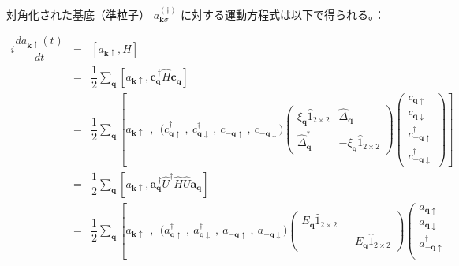 \documentclass[uplatex,a4j,12pt,dvipdfmx]{jsarticle}
\begin{document}
対角化された基底（準粒子） $a_{\bm{k} \sigma}^{(\dagger)}$
に対する運動方程式は以下で得られる。：

\begin{eqnarray}
	i \dfrac{d a_{\bm{k}\uparrow}(t)}{dt}
	&=&
	\left[ a_{\bm{k}\uparrow} , H \right]
	\nonumber \\[2mm] &=&
	\dfrac{1}{2}
	\sum_{\bm{q}}
	\left[ a_{\bm{k}\uparrow} , \bm{c}_{\bm{q}}^{\ \dagger} \hat{H} \bm{c}_{\bm{q}} \right]
	\nonumber \\[2mm] &=&
	\dfrac{1}{2}
	\sum_{\bm{q}}
	\left[ a_{\bm{k}\uparrow}
		\ \ , \ \
		\big( c^{\dagger}_{\bm{q} \uparrow} \ , \ c^{\dagger}_{\bm{q} \downarrow} \ , \ c_{-\bm{q} \uparrow} \ , \ c_{-\bm{q} \downarrow}  \big)
		\!\!\!
		\left(
		\begin{array}{cc}
				\xi_{\bm{q}} \hat{1}_{2 \times 2} & \hat{\Delta}_{\bm{q}}               \\[3mm]
				\hat{\Delta}^{*}_{\bm{q}}         & - \xi_{\bm{q}} \hat{1}_{2 \times 2}
			\end{array}
		\right)
		\!\!\!
		\left(
		\begin{array}{c}
				c_{\bm{q} \uparrow}            \\[2mm]
				c_{\bm{q} \downarrow}          \\[2mm]
				c^{\dagger}_{-\bm{q} \uparrow} \\[2mm]
				c^{\dagger}_{-\bm{q} \downarrow}
			\end{array}
		\right)
		\right]
	\nonumber \\[2mm] &=&
	\dfrac{1}{2}
	\sum_{\bm{q}}
	\left[ a_{\bm{k}\uparrow} , \bm{a}_{\bm{q}}^{\ \dagger} \hat{U}^{\dagger} \hat{H} \hat{U} \bm{a}_{\bm{q}} \right]
	\nonumber \\[2mm] &=&
	\dfrac{1}{2}
	\sum_{\bm{q}}
	\left[ a_{\bm{k}\uparrow}
		\ \ , \ \
		\big( a^{\dagger}_{\bm{q} \uparrow} \ , \ a^{\dagger}_{\bm{q} \downarrow} \ , \ a_{-\bm{q} \uparrow} \ , \ a_{-\bm{q} \downarrow}  \big)
		\!\!\!
		\left(
		\begin{array}{cc}
				E_{\bm{q}} \hat{1}_{2 \times 2} &
				\\[3mm]
				                                 & - E_{\bm{q}} \hat{1}_{2 \times 2}
			\end{array}
		\right)
		\!\!\!
		\left(
		\begin{array}{c}
				a_{\bm{q} \uparrow}            \\[2mm]
				a_{\bm{q} \downarrow}          \\[2mm]
				a^{\dagger}_{-\bm{q} \uparrow} \\[2mm]

\end{array}
\end{eqnarray}
\end{document}
